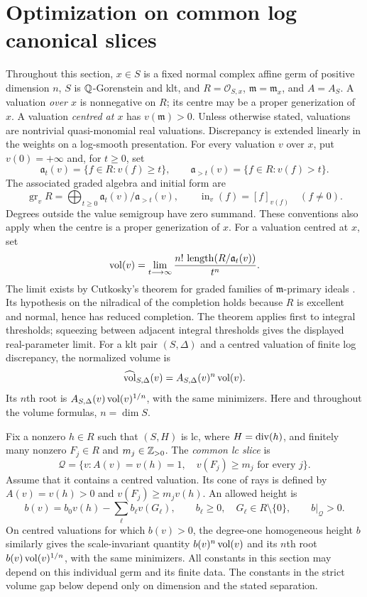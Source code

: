 \section{Optimization on common log canonical slices}\label{sec:E}

Throughout this section, $x\in S$ is a fixed normal complex affine germ of
positive dimension $n$, $S$ is $\mathbb Q$-Gorenstein and klt, and
$R=\mathcal O_{S,x}$, $\mathfrak m=\mathfrak m_x$, and $A=A_S$.
A valuation \emph{over $x$} is nonnegative on $R$; its centre may be a
proper generization of $x$. A valuation \emph{centred at $x$} has
$v(\mathfrak m)>0$. Unless otherwise stated, valuations are nontrivial
quasi-monomial real valuations. Discrepancy is extended linearly in the
weights on a log-smooth presentation. For every valuation $v$ over $x$,
put $v(0)=+\infty$ and, for $t\ge0$, set
\[
 \mathfrak a_t(v)=\{f\in R:v(f)\ge t\},\qquad
 \mathfrak a_{>t}(v)=\{f\in R:v(f)>t\}.
\]
The associated graded algebra and initial form are
\[
 \operatorname{gr}_v R=\bigoplus_{t\ge0}
       \mathfrak a_t(v)/\mathfrak a_{>t}(v),\qquad
 \operatorname{in}_v(f)=[f]_{v(f)}\quad(f\ne0).
\]
Degrees outside the value semigroup have zero summand. These conventions
also apply when the centre is a proper generization of $x$.
For a valuation centred at $x$, set
\[
 \operatorname{vol}(v)=\lim_{t\longrightarrow\infty}
       \frac{n!\,\operatorname{length}(R/\mathfrak a_t(v))}{t^n}.
\]
The limit exists by Cutkosky's theorem for graded families of
$\mathfrak m$-primary ideals \cite[Theorem~1.1 (=5.5)]{CutkoskyVolumes}.
Its hypothesis on the nilradical of the completion holds because $R$
is excellent and normal, hence has reduced completion.  The theorem
applies first to integral thresholds; squeezing between adjacent integral
thresholds gives the displayed real-parameter limit.
For a klt pair $(S,\Delta)$ and a centred valuation of finite log discrepancy,
the normalized volume is
\[
 \widehat{\operatorname{vol}}_{S,\Delta}(v)=A_{S,\Delta}(v)^n\operatorname{vol}(v).
\]
Its $n$th root is $A_{S,\Delta}(v)\operatorname{vol}(v)^{1/n}$, with the same minimizers.
Here and throughout the volume formulas, $n=\dim S$.

Fix a nonzero $h\in R$ such that $(S,H)$ is lc, where
$H=\operatorname{div}(h)$, and finitely many nonzero $F_j\in R$ and
$m_j\in\mathbb Z_{>0}$. The \emph{common lc slice} is
\begin{equation}\label{eq:E-slice}
 \mathcal Q=\{v:A(v)=v(h)=1,\quad v(F_j)\ge m_j\text{ for every }j\}.
\end{equation}
Assume that it contains a centred valuation. Its cone of rays is defined
by $A(v)=v(h)>0$ and $v(F_j)\ge m_jv(h)$.
An allowed height is
\begin{equation}\label{eq:E-height}
 b(v)=b_0v(h)-\sum_{\ell}b_{\ell}v(G_{\ell}),
 \qquad b_{\ell}\ge0,\quad G_{\ell}\in R\setminus\{0\},
 \qquad b|_{\mathcal Q}>0.
\end{equation}
On centred valuations for which $b(v)>0$, the degree-one homogeneous
height $b$ similarly gives the scale-invariant quantity $b(v)^n\operatorname{vol}(v)$ and its
$n$th root $b(v)\operatorname{vol}(v)^{1/n}$, with the same minimizers.
All constants in this section may depend on this individual germ and
its finite data. The constants in the strict volume gap below depend
only on dimension and the stated separation.

